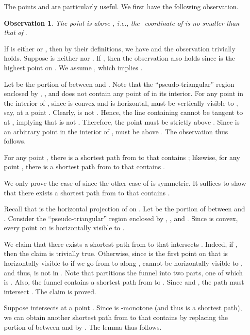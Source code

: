 \documentclass[english,runningheads,11pt]{llncs}
\newenvironment{proof}{\noindent {\textbf{Proof:}}\rm}{\hfill \rm}
\newtheorem{observation}{Observation}
\begin{document}
The points  and  are particularly useful.
We first have the following observation.

\begin{observation}\label{obser:10}
The point  is above , i.e., the -coordinate of  is no smaller than that of .
\end{observation}
\begin{proof}
If  is either  or , then by their definitions, we have  and
the observation trivially holds. Suppose  is neither  nor . If , then
the observation also holds since  is the highest point on . We assume ,
which implies .

Let  be the portion of  between  and . Note that the
``pseudo-triangular'' region enclosed by , , and  does not contain any point of  in its interior.
For any point  in the interior of ,
since  is convex and  is horizontal,  must be vertically
visible to , say, at a point . Clearly,  is not .
Hence, the line containing  cannot be tangent to  at ,
implying that  is not . Therefore, the point  must be strictly above . Since  is an arbitrary point in the interior of ,  must be above . The observation thus follows.
\end{proof}


\begin{lemma}\label{lem:100}
For any point , there is a shortest path from  to  that
contains ; likewise,
for any point , there is a shortest
path from  to  that contains .
\end{lemma}
\begin{proof}
We only prove the case of  since the other case of
 is symmetric. It suffices to show that there exists a shortest
path from  to  that contains .

Recall that  is the horizontal projection of  on . Let  be the portion of  between  and .
Consider the ``pseudo-triangular'' region  enclosed by ,
, and . Since  is convex, every point on
 is horizontally visible to .

We claim that there exists a shortest path  from  to  that intersects . Indeed, if , then the claim is trivially true. Otherwise, since  is the first point on  that is horizontally visible to  if we go from  to  along ,  cannot be horizontally visible to , and thus,  is not in . Note that  partitions the funnel  into two parts, one of which is . Also,
the funnel  contains a shortest path  from  to . Since  and , the path  must intersect . The claim is proved.

Suppose  intersects  at a point . Since  is -monotone (and thus is a shortest path), we can obtain another shortest path from  to  that contains  by replacing the portion of  between  and  by . The lemma thus follows.
\end{proof}
\end{document}
